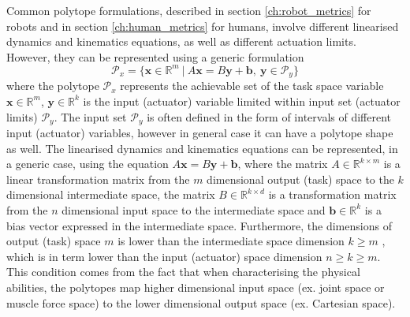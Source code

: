 Common polytope formulations, described in section \ref{ch:robot_metrics} for robots and in section \ref{ch:human_metrics} for humans, involve different linearised dynamics and kinematics equations, as well as different actuation limits. However, they can be represented using a generic formulation
\begin{equation}
    \mathcal{P}_x = \{\bm{x}\in\mathbb{R}^m ~|~ A\bm{x}=B\bm{y} + \bm{b}, ~ \bm{y}\in\mathcal{P}_y\}
    \label{eq:generic_polyt_view}
\end{equation}
where the polytope $\mathcal{P}_x$ represents the achievable set of the task space variable $\bm{x}\in\mathbb{R}^m$, $\bm{y}\in\mathbb{R}^k$ is the input (actuator) variable limited within input set (actuator limits) $\mathcal{P}_y$. The input set $\mathcal{P}_y$ is often defined in the form of intervals of different input (actuator) variables, however in general case it can have a polytope shape as well. The linearised dynamics and kinematics equations can be represented, in a generic case, using the equation $A\bm{x}\!=\!B\bm{y}\!+\!\bm{b}$, where the matrix $A\in\mathbb{R}^{k\times m}$ is a linear transformation matrix from the $m$ dimensional output (task) space to the $k$ dimensional intermediate space, the matrix $B\in\mathbb{R}^{k\times d}$ is a transformation matrix from the $n$ dimensional input space to the intermediate space and $\bm{b}\in\mathbb{R}^k$ is a bias vector expressed in the intermediate space. Furthermore, the dimensions of output (task) space $m$ is lower than the intermediate space dimension $k\!\geq\! m$ , which is in term lower than the input (actuator) space dimension $n\!\geq\! k\!\geq\! m$. This condition comes from the fact that when characterising the physical abilities, the polytopes map higher dimensional input space (ex. joint space or muscle force space) to the lower dimensional output space (ex. Cartesian space).

